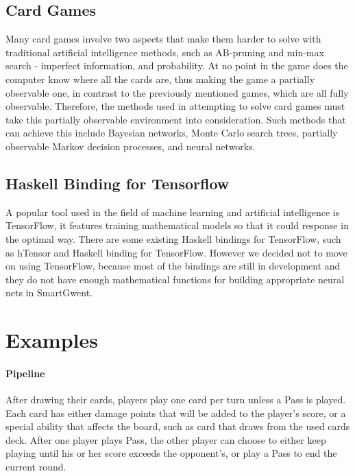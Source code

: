 \documentclass[numbers]{sigplanconf}
\begin{document}
\subsection{Card Games}
Many card games involve two aspects that make them harder to solve with traditional artificial intelligence methods, such as AB-pruning and min-max search - imperfect information, and probability. At no point in the game does the computer know where all the cards are, thus making the game a partially observable one, in contrast to the previously mentioned games, which are all fully observable. Therefore, the methods used in attempting to solve card games must take this partially observable environment into consideration. Such methods that can achieve this include Bayesian networks, Monte Carlo search trees, partially observable Markov decision processes, and neural networks\cite{russell2003artificial}.


\subsection{Haskell Binding for Tensorflow}
A popular tool used in the field of machine learning and artificial intelligence is TensorFlow, it features training mathematical models so that it could response in the optimal way. There are some existing Haskell bindings for TensorFlow, such as hTensor and Haskell binding for TensorFlow. However we decided not to move on using TensorFlow, because most of the bindings are still in development and they do not have enough mathematical functions for building appropriate neural nets in SmartGwent.


\section{Examples}

\paragraph{Pipeline}
After drawing their cards,  players play one card per turn unless a Pass is played. Each card has either damage points that will be added to the player's score, or a special ability that affects the board, such as card that draws from the used cards deck. After one player plays Pass, the other player can choose to either keep playing until his or her score exceeds the opponent's, or play a Pass to end the current round.
\end{document}
